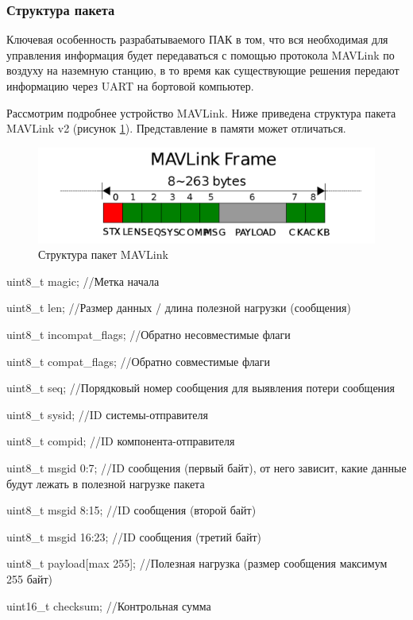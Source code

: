 \subsubsection{Структура пакета}
Ключевая особенность разрабатываемого ПАК в том, что вся необходимая для управления информация будет передаваться с помощью протокола MAVLink по воздуху на наземную станцию, в то время как существующие решения передают информацию через UART на бортовой компьютер.

Рассмотрим подробнее устройство MAVLink. Ниже приведена структура пакета MAVLink v2 (рисунок \ref{fig:mavlink}). Представление в памяти может отличаться.
\begin{figure}[H]
	\centering
	\includegraphics[width=0.7\linewidth]{./pics/mavlink}
	\caption{Структура пакет MAVLink
	}
	\label{fig:mavlink} %
\end{figure}

uint8\_t magic;              //Метка начала

uint8\_t len;                //Размер данных / длина полезной нагрузки (сообщения)

uint8\_t incompat\_flags;     //Обратно несовместимые флаги

uint8\_t compat\_flags;       //Обратно совместимые флаги

uint8\_t seq;                //Порядковый номер сообщения для выявления потери сообщения

uint8\_t sysid;              //ID системы-отправителя

uint8\_t compid;             //ID компонента-отправителя

uint8\_t msgid 0:7;          //ID сообщения (первый байт), от него зависит, какие данные будут лежать в полезной нагрузке пакета

uint8\_t msgid 8:15;         //ID сообщения (второй байт)

uint8\_t msgid 16:23;        //ID сообщения (третий байт)

uint8\_t payload[max 255];   //Полезная нагрузка (размер сообщения максимум 255 байт) 

uint16\_t checksum;          //Контрольная сумма

